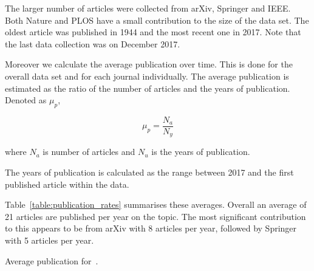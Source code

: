 \documentclass{article}
\begin{document}
The larger number of articles were collected from arXiv, Springer and IEEE. Both
Nature and PLOS have a small contribution to the size of the data set. The oldest
article was published in 1944 and the most recent one in 2017. Note
that the last data collection was on December 2017.

Moreover we calculate the average publication over time. This is done for the overall
data set and for each journal individually. The average publication is estimated
as the ratio of the number of articles and the years of publication. Denoted as
\(\mu_p\),

\[ \mu_p = \frac{N_a}{N_y}\]

where \(N_a\) is number of articles and \(N_u\) is the years of publication.

The years of publication is calculated as the range between 2017 and the first published
article within the data.

Table~\ref{table:publication_rates} summarises these averages. Overall an average of
21 articles are published per year on the topic. The most significant contribution
to this appears to be from arXiv with 8 articles per year, followed by Springer
with 5 articles per year.

\begin{table}[!hbtp]
    \begin{center}
    
    \end{center}
    \caption{Average publication for~\cite{}.}
    \label{table:publication_rates}
\end{table}


\end{document}
